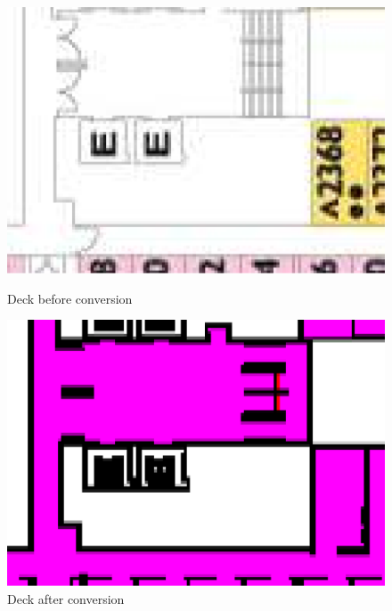 \documentclass[11pt]{article}
\begin{document}
\begin{figure}[H]
\centering
{\begin{minipage}[t]{7.4cm}
\includegraphics[width=\textwidth]{Decksetup-stairs.pdf}
\caption{Deck before conversion}
\label{Deck-stairs}
\end{minipage}}
{\begin{minipage}[t]{7.4cm}
\includegraphics[width=\textwidth]{Decksetup-elevator.pdf}
\caption{Deck after conversion}
\label{Deck-elevator}
\end{minipage}}
\end{figure}
\end{document}
